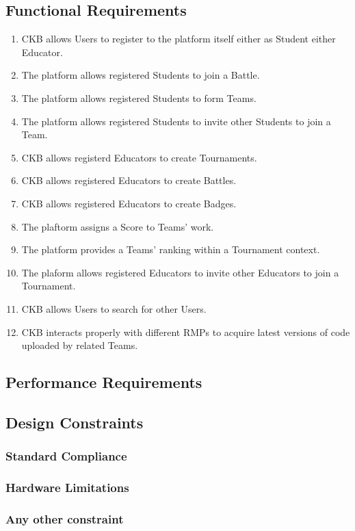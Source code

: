 \subsection{Functional Requirements}
\begin{enumerate}[label=$\bullet$ \textbf{R\arabic*:}]
    \item CKB allows Users to register to the platform itself either as Student either Educator.
    \item The platform allows registered Students to join a Battle.
    \item The platform allows registered Students to form Teams.
    \item The platform allows registered Students to invite other Students to join a Team.
    \item CKB allows registerd Educators to create Tournaments.
    \item CKB allows registered Educators to create Battles.
    \item CKB allows registered Educators to create Badges.
    \item The plaftorm assigns a Score to Teams' work.
    \item The platform provides a Teams' ranking within a Tournament context.
    \item The plaform allows registered Educators to invite other Educators to join a Tournament.
    \item CKB allows Users to search for other Users.
    \item CKB interacts properly with different RMPs to acquire latest versions of code uploaded by related Teams. 
\end{enumerate}
\subsection{Performance Requirements}
\subsection{Design Constraints}

\subsubsection{Standard Compliance}
\subsubsection{Hardware Limitations}
\subsubsection{Any other constraint}

